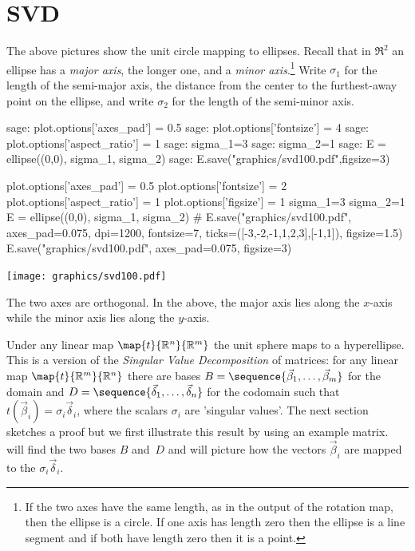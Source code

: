 \section{SVD}
The above pictures show the unit circle mapping to ellipses.
Recall that in $\Re^2$ an ellipse has a \textit{major axis}, 
the longer one, and a 
\textit{minor axis}.\footnote{If the two axes have the same length,
as in the output of the rotation map, 
then the ellipse is a circle.
If one axis has length zero then the ellipse is a line segment 
and if both have length zero then it is a point.}
Write $\sigma_1$ for the length of the semi-major axis, 
the distance from the center to the furthest-away point on the ellipse,
and write $\sigma_2$ for the length of the semi-minor axis.
\begin{sagecommandline}
sage: plot.options['axes_pad'] = 0.5
sage: plot.options['fontsize'] = 4
sage: plot.options['aspect_ratio'] = 1
sage: sigma_1=3
sage: sigma_2=1
sage: E = ellipse((0,0), sigma_1, sigma_2)
sage: E.save("graphics/svd100.pdf",figsize=3)
\end{sagecommandline}
\begin{sagesilent}
plot.options['axes_pad'] = 0.5
plot.options['fontsize'] = 2
plot.options['aspect_ratio'] = 1
plot.options['figsize'] = 1
sigma_1=3
sigma_2=1
E = ellipse((0,0), sigma_1, sigma_2)
# E.save("graphics/svd100.pdf", axes_pad=0.075, dpi=1200, fontsize=7, ticks=([-3,-2,-1,1,2,3],[-1,1]), figsize=1.5)
E.save("graphics/svd100.pdf", axes_pad=0.075, figsize=3)
\end{sagesilent}
\begin{center}
  \texttt{[image: graphics/svd100.pdf]}
\end{center}
The two axes are orthogonal.
In the above, the major axis lies along the $x$-axis while the
minor axis lies along the $y$-axis.

Under any linear map $\map{t}{\Re^n}{\Re^m}$ the 
unit sphere maps to a hyperellipse.
This is a version of the \textit{Singular Value Decomposition} of
matrices:
for any linear map $\map{t}{\Re^m}{\Re^n}$ there are bases
$B=\sequence{\vec{\beta}_1,\ldots,\vec{\beta}_m}$ for the domain and
$D=\sequence{\vec{\delta}_1,\ldots,\vec{\delta}_n}$ for the codomain
such that $t(\vec{\beta}_i)=\sigma_i\vec{\delta}_i$, where the
scalars $\sigma_i$ are 'singular values'.
The next section sketches a proof
but we first illustrate this result by using an example matrix.
\Sage{} will find the two bases $B$ and~$D$ and will picture how the 
vectors $\vec{\beta}_i$ 
are mapped to the $\sigma_i\vec{\delta}_i$.

